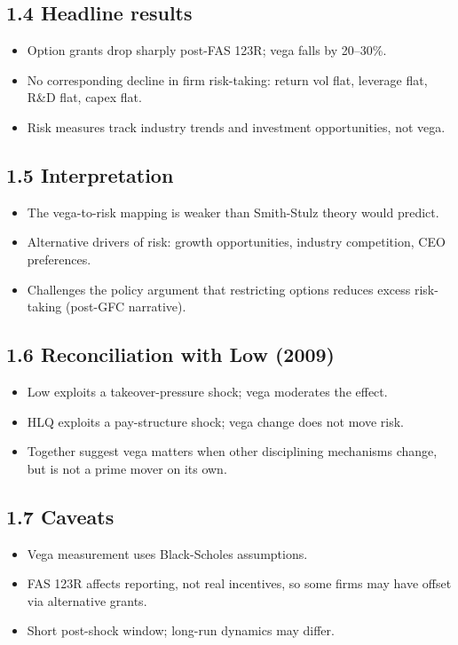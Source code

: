 \documentclass[11pt]{article}
\begin{document}
\subsection*{1.4 Headline results}
\begin{itemize}
\item Option grants drop sharply post-FAS 123R; vega falls by 20--30\%.
\item No corresponding decline in firm risk-taking: return vol flat, leverage flat, R\&D flat, capex flat.
\item Risk measures track industry trends and investment opportunities, not vega.
\end{itemize}

\subsection*{1.5 Interpretation}
\begin{itemize}
\item The vega-to-risk mapping is weaker than Smith-Stulz theory would predict.
\item Alternative drivers of risk: growth opportunities, industry competition, CEO preferences.
\item Challenges the policy argument that restricting options reduces excess risk-taking (post-GFC narrative).
\end{itemize}

\subsection*{1.6 Reconciliation with Low (2009)}
\begin{itemize}
\item Low exploits a takeover-pressure shock; vega moderates the effect.
\item HLQ exploits a pay-structure shock; vega change does not move risk.
\item Together suggest vega matters when other disciplining mechanisms change, but is not a prime mover on its own.
\end{itemize}

\subsection*{1.7 Caveats}
\begin{alertbox}
\begin{itemize}
\item Vega measurement uses Black-Scholes assumptions.
\item FAS 123R affects reporting, not real incentives, so some firms may have offset via alternative grants.
\item Short post-shock window; long-run dynamics may differ.
\end{itemize}
\end{alertbox}
\end{document}
